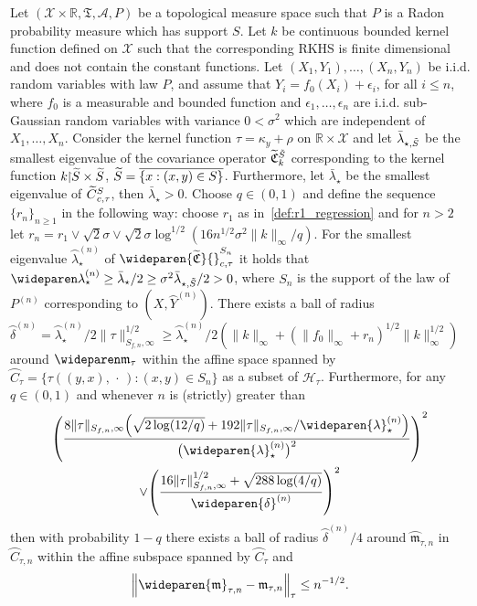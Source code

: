 \documentclass[10pt]{amsart}
\theoremstyle{definition}\newtheorem{defi}[theo]{Definition}\newtheorem{rema}[theo]{Remark}\newtheorem{exam}[theo]{Example}\newtheorem{exem}[theo]{Example}\newtheorem{nota}[theo]{Notation}
\theoremstyle{remark}
\newcommand{\restrr}
{\!\!\upharpoonright\!\!}
\newcommand{\R}{\mathbb{R}}
\newcommand{\X}{\mathcal{X}}
\newcommand{\clA}{\mathcal{A}}
\newcommand{\cH}{\mathcal{H}}
\newcommand{\fkC}{\mathfrak{C}}
\newcommand{\fkT}{\mathfrak{T}}
\newcommand{\Cov}{\tilde{\fkC}}
\newcommand{\mean}{\mathfrak{m}}
\newcommand{\CovCapntau}{\wideparen{\widetilde{\fkC}}{\vphantom{\fkC}}^{S_n}_{c,\tau}}
\let\oldtilde\tilde
\renewcommand*{\tilde}[1]{\mathchoice{\widetilde{#1}}{\widetilde{#1}}{\oldtilde{#1}}{\oldtilde{#1}}}
\let\originalleft\left
\let\originalright\right
\renewcommand{\left}{\mathopen{}\mathclose\bgroup\originalleft}
\renewcommand{\right}{\aftergroup\egroup\originalright}
\begin{document}
\begin{prop}\label{prop:regression_ball}
Let $(\X \times \R, \fkT, \clA,P)$ be a topological measure space such that $P$ is a Radon probability measure which has support $S$. Let $k$ be continuous bounded kernel function defined on $\X$ such that the corresponding RKHS is finite dimensional and does not contain the constant functions. Let $(X_1,Y_1), \dots, (X_n,Y_n)$ be i.i.d. random variables with law $P$, and assume that $Y_i = f_0(X_i) + \epsilon_i$, for all $i \leq n$, where $f_0$ is a measurable and bounded function and $\epsilon_1,\dots, \epsilon_n$ are i.i.d. sub-Gaussian random variables with variance $0 < \sigma^2$ which are independent of $X_1,\dots, X_n$. Consider the kernel function $\tau = \kappa_y + \rho$ on $\R \times \X$ and let $\bar \lambda_{\star,\tilde S}$ be the smallest eigenvalue of the covariance operator $\Cov^{\tilde S}_k$ corresponding to the kernel function $k\restrr \tilde S \times \tilde S$, $\tilde S = \overline{\{x: (x,y) \in S\}}$. Furthermore, let $\bar \lambda_\star$ be the smallest eigenvalue of $\tilde C_{c,\tau}^S$, then $\bar \lambda_\star>0$. Choose $q \in (0,1)$ and define the sequence $\{r_n\}_{n\geq 1}$ in the following way: choose $r_1$ as in~\eqref{def:r1_regression} and for $n >2$ let $r_n = r_1 \vee\sqrt{2} \sigma \vee \sqrt{2} \sigma \log^{1/2}(16 n^{1/2} \sigma^2 \|k\|_\infty/ q) $. For the smallest eigenvalue $\wideparen \lambda_{\star}^{(n)}$ of $\CovCapntau$ it holds that $\wideparen \lambda_{\star}^{(n)} \geq \bar \lambda_\star/2 \geq \sigma^2 \bar \lambda_{\star,\tilde S}/2 > 0$, where $S_n$ is the support of the law of $P^{(n)}$ corresponding to $(X,\wideparen{Y}^{(n)})$. There exists a ball of radius $\wideparen \delta^{(n)} = \wideparen \lambda_{\star}^{(n)} / 2 \|\tau \|_{S_{f,n},\infty}^{1/2} \geq \wideparen \lambda_{\star}^{(n)} / 2 (\|k\|_\infty + (\|f_0\|_\infty + r_n)^{1/2} \|k\|_\infty^{1/2})$ around $\wideparen \mean_\tau$ within the affine space spanned by $\wideparen{C}_\tau = \{ \tau((y,x),\,\cdot\,) : (x,y) \in S_n\}$ as a subset of $\cH_\tau$. Furthermore, for any $q \in (0,1)$ and whenever $n$ is (strictly) greater than
\begin{multline*}
\left(
\frac{8 \|\tau\|_{S_{f,n},\infty} \left(\sqrt{2\log(12/q)} + 192\|\tau\|_{S_{f,n},\infty} /\wideparen{\lambda}_\star^{(n)}\right)}{\bigl(\wideparen{\lambda}_\star^{(n)}\bigr)^2} \right)^{2}\\ 
\vee
\left(\frac{16\|\tau\|_{S_{f,n},\infty}^{1/2} + \sqrt{288\log(4/q)}}{\wideparen{\delta}^{(n)}}\right)^{2}
\end{multline*}
then with probability $1-q$ there exists a ball of radius $\wideparen \delta^{(n)}/4$ around $\wideparen{\mean}_{\tau,n}$ in $\wideparen{C}_{\tau,n}$ within the affine subspace spanned by $\wideparen{C}_\tau$ and
\[
\left\|\wideparen{\mean}_{\tau,n} - \mean_{\tau,n}\right\|_\tau \leq n^{-1/2}.
\]
\end{prop}
\end{document}
